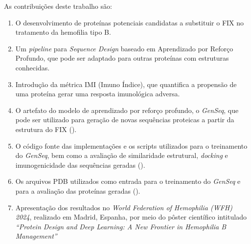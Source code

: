 As contribuições deste trabalho são:
\begin{enumerate}
  \item O desenvolvimento de proteínas potenciais candidatas a substituir o FIX no tratamento da hemofilia tipo B.
  \item Um \textit{pipeline} para \textit{Sequence Design} baseado em Aprendizado por Reforço Profundo, que pode ser adaptado para outras proteínas com estruturas conhecidas.
  \item Introdução da métrica IMI (Imuno Índice), que quantifica a propensão de uma proteína gerar uma resposta imunológica adversa.
  \item O artefato do modelo de aprendizado por reforço profundo, o \textit{GenSeq}, que pode ser utilizado para geração de novas sequências proteicas a partir da estrutura do FIX (\cite{repo}).
  \item O código fonte das implementações e os scripts utilizados para o treinamento do \textit{GenSeq}, bem como a avaliação 
  de similaridade estrutural, \textit{docking} e imunogenicidade das sequências geradas (\cite{repo}).
  \item Os arquivos PDB utilizados como entrada para o treinamento do \textit{GenSeq} e para a avaliação das proteínas geradas (\cite{repo}).
  \item Apresentação dos resultados no \textit{World Federation of Hemophilia (WFH) 2024}, realizado em Madrid, Espanha, por meio do pôster científico intitulado \textit{“Protein Design and Deep Learning: A New Frontier in Hemophilia B Management”} \cite{WFH2024}
\end{enumerate}